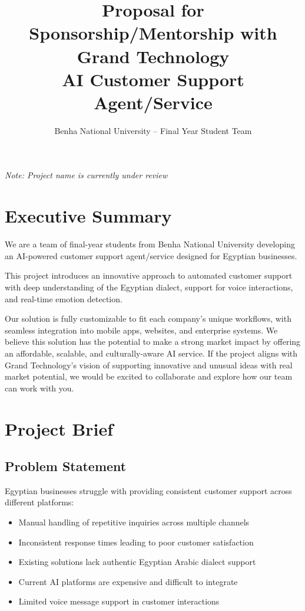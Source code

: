 \documentclass[12pt,a4paper]{article}
\title{Proposal for Sponsorship/Mentorship with Grand Technology \\ 
\large AI Customer Support Agent/Service}
\author{Benha National University – Final Year Student Team}
\date{}
\begin{document}
\maketitle

\textit{Note: Project name is currently under review}

\section*{Executive Summary}
We are a team of final-year students from Benha National University developing an AI-powered customer support agent/service designed for Egyptian businesses. 

This project introduces an innovative approach to automated customer support with deep understanding of the Egyptian dialect, support for voice interactions, and real-time emotion detection. 

Our solution is fully customizable to fit each company’s unique workflows, with seamless integration into mobile apps, websites, and enterprise systems. We believe this solution has the potential to make a strong market impact by offering an affordable, scalable, and culturally-aware AI service. If the project aligns with Grand Technology’s vision of supporting innovative and unusual ideas with real market potential, we would be excited to collaborate and explore how our team can work with you.

\section*{Project Brief}

\subsection*{Problem Statement}
Egyptian businesses struggle with providing consistent customer support across different platforms:
\begin{itemize}
    \item Manual handling of repetitive inquiries across multiple channels
    \item Inconsistent response times leading to poor customer satisfaction
    \item Existing solutions lack authentic Egyptian Arabic dialect support
    \item Current AI platforms are expensive and difficult to integrate
    \item Limited voice message support in customer interactions
\end{itemize}
\newpage
\end{document}
